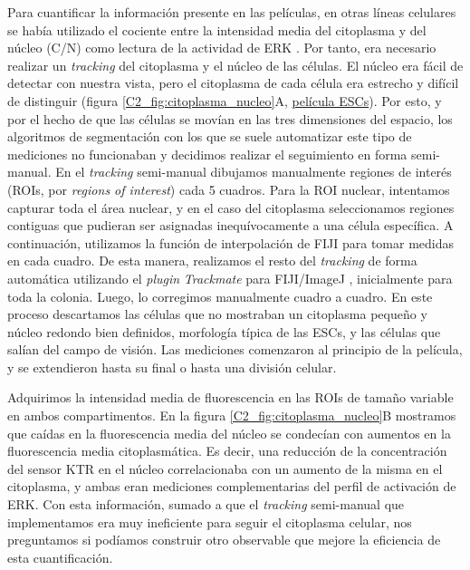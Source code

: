 \documentclass[./main.tex]{subfiles}
\begin{document}
Para cuantificar la información presente en las películas, en otras líneas celulares se había utilizado el cociente entre la intensidad media del citoplasma y del núcleo (C/N) como lectura de la actividad de ERK \cite{Regot2014}. Por tanto, era necesario realizar un \textit{tracking} del citoplasma y el núcleo de las células. El núcleo era fácil de detectar con nuestra vista, pero el citoplasma de cada célula era estrecho y difícil de distinguir (figura \ref{C2_fig:citoplasma_nucleo}A, \href{http://movie.biologists.com/video/10.1242/dev.199710/video-1}{película ESCs}). Por esto, y por el hecho de que las células se movían en las tres dimensiones del espacio, los algoritmos de segmentación con los que se suele automatizar este tipo de mediciones no funcionaban y decidimos realizar el seguimiento en forma semi-manual. En el \textit{tracking} semi-manual dibujamos manualmente regiones de interés (ROIs, por \textit{regions of interest}) cada 5 cuadros. Para la ROI nuclear, intentamos capturar toda el área nuclear, y en el caso del citoplasma seleccionamos regiones contiguas que pudieran ser asignadas inequívocamente a una célula específica. A continuación, utilizamos la función de interpolación de FIJI para tomar medidas en cada cuadro. De esta manera, realizamos el resto del \textit{tracking} de forma automática utilizando el \textit{plugin} \textit{Trackmate} para FIJI/ImageJ \cite{Tinevez2017}, inicialmente para toda la colonia. Luego, lo corregimos manualmente cuadro a cuadro. En este proceso descartamos las células que no mostraban un citoplasma pequeño y núcleo redondo bien definidos, morfología típica de las ESCs, y las células que salían del campo de visión. Las mediciones comenzaron al principio de la película, y se extendieron hasta su final o hasta una división celular. 


Adquirimos la intensidad media de fluorescencia en las ROIs de tamaño variable en ambos compartimentos. En la figura \ref{C2_fig:citoplasma_nucleo}B mostramos que caídas en la fluorescencia media del núcleo se condecían con aumentos en la fluorescencia media citoplasmática. Es decir, una reducción de la concentración del sensor KTR en el núcleo correlacionaba con un aumento de la misma en el citoplasma, y ambas eran mediciones complementarias del perfil de activación de ERK. Con esta información, sumado a que el \textit{tracking} semi-manual que implementamos era muy ineficiente para seguir el citoplasma celular, nos preguntamos si podíamos construir otro observable que mejore la eficiencia de esta cuantificación.
\end{document}
